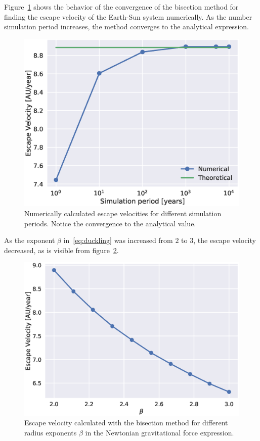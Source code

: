 \documentclass[aps,reprint]{revtex4-1}
\begin{document}
Figure~\ref{fig:escvel} shows the behavior of the convergence of the bisection
method for finding the escape velocity of the Earth-Sun system numerically. As
the number simulation period increases, the method converges to the analytical
expression.
\begin{figure}[H]
  \includegraphics[width=\columnwidth]{figures/escapevelocity.eps}
  \caption{Numerically calculated escape velocities for different simulation
  periods. Notice the convergence to the analytical value.}
  \label{fig:escvel}
\end{figure}

As the exponent \(\beta\) in~\eqref{eq:duckling} was increased from \(2\) to
\(3\), the escape velocity decreased, as is visible from figure~\ref{fig:hei}.
\begin{figure}[H]
  \includegraphics[width=\columnwidth]{figures/escapevelocitybeta.eps}
  \caption{Escape velocity calculated with the bisection method for different
  radius exponents $\beta$ in the Newtonian gravitational force expression.}
  \label{fig:hei}
\end{figure}
\end{document}
